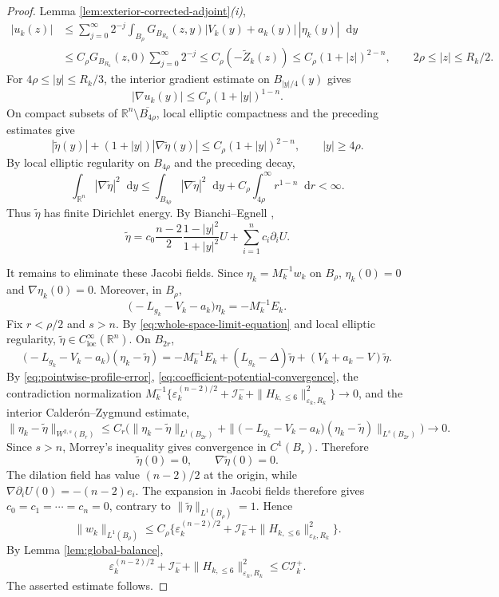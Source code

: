 \documentclass[11pt]{article}
\numberwithin{equation}{section}
\theoremstyle{remark}
\newcommand{\R}{\mathbb R}
\newcommand{\dd}{\mathop{}\!\mathrm{d}}
\begin{document}
\begin{proof}
Lemma  \ref{lem:exterior-corrected-adjoint}\emph{(i)},
{
\[
\begin{aligned}
 |u_k(z)|
 &\le\sum_{j=0}^\infty 2^{-j}
 \int_{B_\rho}G_{B_{R_k}}(z,y)
 |V_k(y)+a_k(y)|\,|\eta_k(y)|\dd y\\
 &\le C_\rho G_{B_{R_k}}(z,0)
 \sum_{j=0}^\infty 2^{-j}\le C_\rho(-\widetilde Z_k(z))
 \le C_\rho(1+|z|)^{2-n},
 \qquad 2\rho\le|z|\le R_k/2.
\end{aligned}
\]
}
For $4\rho\le|y|\le R_k/3$, the interior gradient estimate on
 $B_{|y|/4}(y)$ gives
{
\[
 |\nabla u_k(y)|\le C_\rho(1+|y|)^{1-n}.
\]
}
On compact subsets of $\R^n\setminus\overline{B_{4\rho}}$, local elliptic
compactness and the preceding estimates give
{
\[
 |\widetilde\eta(y)|+(1+|y|)|\nabla\widetilde\eta(y)|
 \le C_\rho(1+|y|)^{2-n},
 \qquad |y|\ge4\rho.
\]
}
By local elliptic regularity on $B_{4\rho}$ and the preceding decay,
{
\[
 \int_{\R^n}|\nabla\widetilde\eta|^2\dd y
 \le \int_{B_{4\rho}}|\nabla\widetilde\eta|^2\dd y
 +C_\rho\int_{4\rho}^{\infty}r^{1-n}\dd r<\infty.
\]
}
Thus $\widetilde\eta$ has finite Dirichlet energy.  By
Bianchi--Egnell \cite[Lemma  A1]{BianchiEgnell},
{
\[
 \widetilde\eta
 =c_0\frac{n-2}{2}\frac{1-|y|^2}{1+|y|^2}U
  +\sum_{i=1}^nc_i\partial_iU.
\]
}

It remains to eliminate these Jacobi fields.  Since
$\eta_k=M_k^{-1}w_k$ on $B_\rho$,
$\eta_k(0)=0$ and  $\nabla\eta_k(0)=0$.
Moreover, in $B_\rho$,
{
\[
 \big(-L_{g_k}-V_k-a_k\big)\eta_k=-M_k^{-1}E_k.
\]
}
 Fix $r<\rho/2$ and $s>n$.  By
\eqref{eq:whole-space-limit-equation} and local elliptic regularity,
$\widetilde\eta\in C^\infty_{\mathrm{loc}}(\R^n)$.  On $B_{2r}$,
{
\[
 \big(-L_{g_k}-V_k-a_k\big)(\eta_k-\widetilde\eta)
 =-M_k^{-1}E_k+(L_{g_k}-\Delta)\widetilde\eta
 +(V_k+a_k-V)\widetilde\eta.
\]
}
 By \eqref{eq:pointwise-profile-error},
\eqref{eq:coefficient-potential-convergence},
the contradiction normalization
$M_k^{-1}\{\varepsilon_k^{(n-2)/2}+\mathcal I_k^-
+\|H_{k,\le6}\|_{\varepsilon_k,R_k}^2\}\to0$, and the interior
Calder\'on--Zygmund estimate,
{
\[
 \|\eta_k-\widetilde\eta\|_{W^{2,s}(B_r)}
 \le C_r\Big(
 \|\eta_k-\widetilde\eta\|_{L^1(B_{2r})}
 +\|\big(-L_{g_k}-V_k-a_k\big)
       (\eta_k-\widetilde\eta)\|_{L^s(B_{2r})}\Big)
 \to0.
\]
}
Since $s>n$, Morrey's inequality gives convergence in $C^1(B_r)$.
Therefore
{
\[
 \widetilde\eta(0)=0,\qquad \nabla\widetilde\eta(0)=0.
\]
}
The  dilation field has value $(n-2)/2$ at the origin, while
$\nabla\partial_iU(0)=-(n-2)e_i$.  The expansion in Jacobi fields therefore
gives $c_0=c_1=\cdots=c_n=0$, contrary to
$\|\widetilde\eta\|_{L^1(B_\rho)}=1$.
Hence
{
\[
 \|w_k\|_{L^1(B_\rho)}
 \le C_\rho\big\{
 \varepsilon_k^{(n-2)/2}+\mathcal I_k^-
 +\|H_{k,\le6}\|_{\varepsilon_k,R_k}^2\big\}.
\]
}
 By Lemma  \ref{lem:global-balance},
{
\[
 \varepsilon_k^{(n-2)/2}+\mathcal I_k^-
 +\|H_{k,\le6}\|_{\varepsilon_k,R_k}^2
 \le C\mathcal I_k^+.
\]
}
The asserted estimate follows.
\end{proof}
\end{document}
